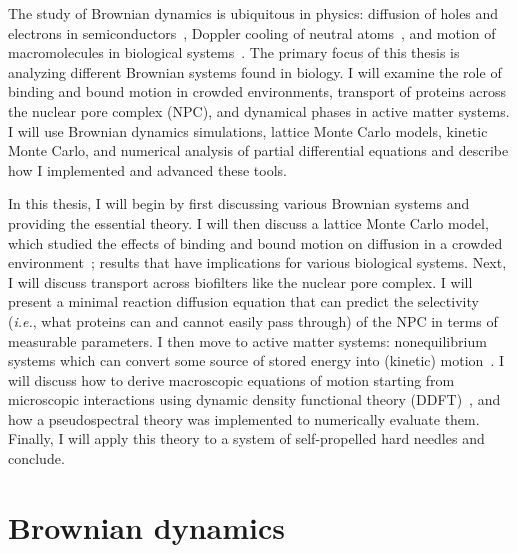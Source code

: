 The study of Brownian dynamics is ubiquitous in physics: diffusion of holes and
electrons in semiconductors~\cite{ashcroft_solid_76}, Doppler cooling of neutral
atoms~\cite{lett_optical_89}, and motion of macromolecules in biological
systems~\cite{berg_random_93}.  The primary focus of this thesis is analyzing
different Brownian systems found in biology.  I will examine the role of binding
and bound motion in crowded environments, transport of proteins across the
nuclear pore complex (NPC), and dynamical phases in active matter systems.  I
will use Brownian dynamics simulations, lattice Monte Carlo models, kinetic
Monte Carlo, and numerical analysis of partial differential equations and
describe how I implemented and advanced these tools.

In this thesis, I will begin by first discussing various Brownian systems and
providing the essential theory.  I will then discuss a lattice Monte Carlo
model, which studied the effects of binding and bound motion on diffusion in a
crowded environment~\cite{stefferson_effects_17}; results that have
implications for various biological systems.  Next, I will discuss transport
across biofilters like the nuclear pore complex.  I will present a minimal
reaction diffusion equation that can predict the selectivity (\textit{i.e.},
what proteins can and cannot easily pass through) of the NPC in terms of
measurable parameters.  I then move to active matter systems: nonequilibrium
systems which can convert some source of stored energy into (kinetic)
motion~\cite{marchetti_hydrodynamics_13}.  I will discuss how to derive
macroscopic equations of motion starting from microscopic interactions using
dynamic density functional theory (DDFT)~\cite{marconi_dynamic_99,
  marconi_dynamic_00, archer_dynamical_04, archer_dynamical_05}, and how a
pseudospectral theory was implemented to numerically evaluate them.  Finally, I
will apply this theory to a system of self-propelled hard needles and conclude.


\section{Brownian dynamics}

